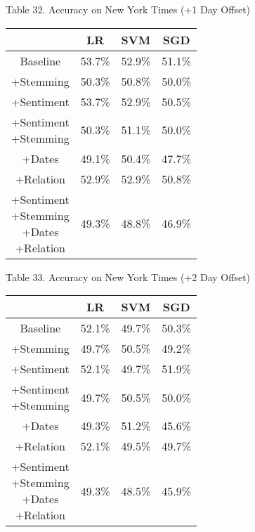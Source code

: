 \documentclass[11pt,a4paper]{article}
\begin{document}
\begin{center}
Table 32. Accuracy on New York Times (+1 Day Offset)\\
\begin{tabular}{ |c|c|c|c| }
 \hline
  & LR & SVM & SGD \\
  \hline
  Baseline & 53.7\% & 52.9\% & 51.1\% \\
  \hline
 +Stemming & 50.3\% & 50.8\% & 50.0\% \\
  \hline
 +Sentiment & 53.7\% & 52.9\% & 50.5\% \\
  \hline
  \shortstack{+Sentiment \\ +Stemming} & 50.3\% & 51.1\% & 50.0\%\\
 \hline
 +Dates & 49.1\% & 50.4\% & 47.7\% \\
  \hline
 +Relation & 52.9\% & 52.9\% & 50.8\% \\
  \hline
  \shortstack{+Sentiment \\ +Stemming \\+Dates \\+Relation} & 49.3\% & 48.8\% & 46.9\% \\
 \hline
\end{tabular}
\end{center}

\begin{center}
Table 33. Accuracy on New York Times (+2 Day Offset)\\
\begin{tabular}{ |c|c|c|c| }
 \hline
  & LR & SVM & SGD \\
  \hline
  Baseline & 52.1\% & 49.7\% & 50.3\% \\
  \hline
 +Stemming & 49.7\% & 50.5\% & 49.2\% \\
  \hline
 +Sentiment & 52.1\% & 49.7\% & 51.9\% \\
  \hline
  \shortstack{+Sentiment \\ +Stemming} & 49.7\% & 50.5\% & 50.0\%\\
 \hline
 +Dates & 49.3\% & 51.2\% & 45.6\% \\
  \hline
 +Relation & 52.1\% & 49.5\% & 49.7\% \\
  \hline
  \shortstack{+Sentiment \\ +Stemming \\+Dates \\+Relation} & 49.3\% & 48.5\% & 45.9\% \\
 \hline
\end{tabular}
\end{center}
\end{document}

